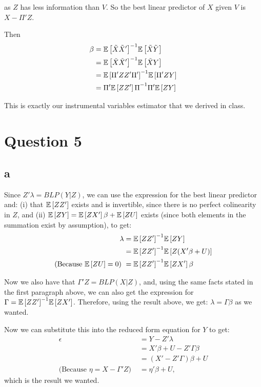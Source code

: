 \documentclass[12pt]{paper}
\begin{document}
as $Z$ has less information than $V$. So the best linear predictor of
$X$ given $V$ is $X - \Pi'Z$. 

Then
\begin{align*}
  \beta &= { \mathbb{E} \left [  \tilde{X} \tilde{X}' \right ]}^{-1} \mathbb{E} \left [  \tilde{X} \tilde{Y} \right ]\\
    &= { \mathbb{E} \left [  \tilde{X} \tilde{X}' \right ]}^{-1} \mathbb{E} \left [  \tilde{X} Y \right ]\\
    &= { \mathbb{E} \left [  \Pi'ZZ' \Pi'  \right ]}^{-1} \mathbb{E} \left [  \Pi'ZY \right ]\\
    &= { \Pi' \mathbb{E} \left [ ZZ' \right ] \Pi}^{-1} \Pi' \mathbb{E} \left [ ZY \right ]
\end{align*}

This is exactly our instrumental variables estimator that we derived
in class. 

\section*{Question 5}

\subsection*{a}

Since $Z'\lambda=BLP(Y|Z)$, we can use the expression for the best linear predictor and: (i) that $\mathbb{E} \left [ ZZ' \right ]$ exists and is invertible, since there is no perfect colinearity in $Z$, and (ii) $\mathbb{E} \left [ ZY \right ]=\mathbb{E} \left [ ZX' \right ]\beta+\mathbb{E} \left [ ZU \right ]$ exists (since both elements in the summation exist by assumption), to get:
\begin{align*}
 \lambda&={\mathbb{E} \left [ ZZ' \right ]}^{-1}\mathbb{E} \left [ ZY \right ]\\
 &={\mathbb{E} \left [ ZZ' \right ]}^{-1}\mathbb{E} \left [ Z(X'\beta+U) \right ]\\
\text{(Because $\mathbb{E} \left [ ZU \right ]=0$)   }  &={\mathbb{E} \left [ ZZ' \right ]}^{-1}\mathbb{E} \left [ ZX' \right ]\beta 
\end{align*}

Now we also have that $\Gamma'Z=BLP(X|Z)$, and, using the same facts stated in the first paragraph above, we can also get the expression for $\Gamma={\mathbb{E} \left [ ZZ' \right ]}^{-1}\mathbb{E} \left [ ZX' \right ]$. Therefore, using the result above, we get: $\lambda=\Gamma\beta$ as we wanted.

Now we can substitute this into the reduced form equation for $Y$ to get:
\begin{align*}
\epsilon&=Y-Z'\lambda\\
&=X'\beta+U-Z'\Gamma\beta\\
&=(X'-Z'\Gamma)\beta+U\\
\text{(Because $\eta=X-\Gamma'Z$)   }&=\eta'\beta+U,
\end{align*}
\noindent which is the result we wanted.
\end{document}
